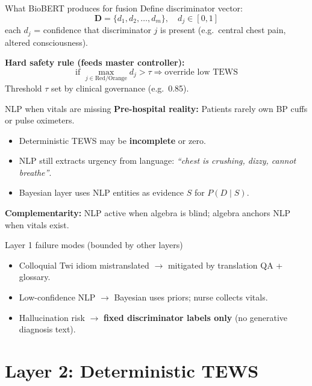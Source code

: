\documentclass[aspectratio=169,11pt]{beamer}
\begin{document}
\begin{frame}{What BioBERT produces for fusion}
	Define discriminator vector:
	\[
	\mathbf{D} = \{ d_1, d_2, \ldots, d_m \}, \quad d_j \in [0,1]
	\]
	each $d_j$ = confidence that discriminator $j$ is present (e.g.\ central chest pain, altered consciousness).

	\vspace{0.3em}
	\textbf{Hard safety rule (feeds master controller):}
	\[
	\text{if } \max_{j \in \text{Red/Orange}} d_j > \tau \Rightarrow \text{override low TEWS}
	\]
	Threshold $\tau$ set by clinical governance (e.g.\ 0.85).
\end{frame}

\begin{frame}{NLP when vitals are missing}
	\textbf{Pre-hospital reality:} Patients rarely own BP cuffs or pulse oximeters.

	\vspace{0.3em}
	\begin{itemize}
		\item Deterministic TEWS may be \textbf{incomplete} or zero.
		\item NLP still extracts urgency from language: \textit{``chest is crushing, dizzy, cannot breathe''}.
		\item Bayesian layer uses NLP entities as evidence $S$ for $P(D \mid S)$.
	\end{itemize}

	\vspace{0.3em}
	\textbf{Complementarity:} NLP active when algebra is blind; algebra anchors NLP when vitals exist.
\end{frame}

\begin{frame}{Layer 1 failure modes (bounded by other layers)}
	\begin{itemize}
		\item Colloquial Twi idiom mistranslated $\rightarrow$ mitigated by translation QA + glossary.
		\item Low-confidence NLP $\rightarrow$ Bayesian uses priors; nurse collects vitals.
		\item Hallucination risk $\rightarrow$ \textbf{fixed discriminator labels only} (no generative diagnosis text).
	\end{itemize}
\end{frame}

\section{Layer 2: Deterministic TEWS}
\end{document}
